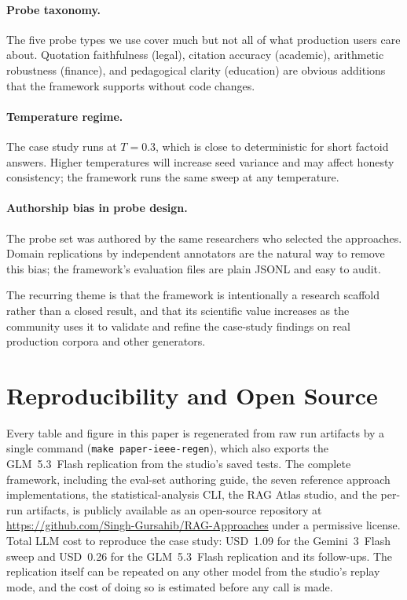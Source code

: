 \documentclass[conference,a4paper,10pt]{IEEEtran}
\begin{document}
\paragraph{Probe taxonomy.}
The five probe types we use cover much but not all of what production users care about.
Quotation faithfulness (legal), citation accuracy (academic), arithmetic robustness (finance), and pedagogical clarity (education) are obvious additions that the framework supports without code changes.

\paragraph{Temperature regime.}
The case study runs at $T = 0.3$, which is close to deterministic for short factoid answers.
Higher temperatures will increase seed variance and may affect honesty consistency; the framework runs the same sweep at any temperature.

\paragraph{Authorship bias in probe design.}
The probe set was authored by the same researchers who selected the approaches.
Domain replications by independent annotators are the natural way to remove this bias; the framework's evaluation files are plain JSONL and easy to audit.

The recurring theme is that the framework is intentionally a research scaffold rather than a closed result, and that its scientific value increases as the community uses it to validate and refine the case-study findings on real production corpora and other generators.

\section{Reproducibility and Open Source}
\label{sec:repro}

Every table and figure in this paper is regenerated from raw run artifacts by a single command (\texttt{make paper-ieee-regen}), which also exports the GLM~5.3~Flash replication from the studio's saved tests.
The complete framework, including the eval-set authoring guide, the seven reference approach implementations, the statistical-analysis CLI, the RAG Atlas studio, and the per-run artifacts, is publicly available as an open-source repository at \url{https://github.com/Singh-Gursahib/RAG-Approaches} under a permissive license.
Total LLM cost to reproduce the case study: USD~1.09 for the Gemini~3~Flash sweep and USD~0.26 for the GLM~5.3~Flash replication and its follow-ups.
The replication itself can be repeated on any other model from the studio's replay mode, and the cost of doing so is estimated before any call is made.
\end{document}
